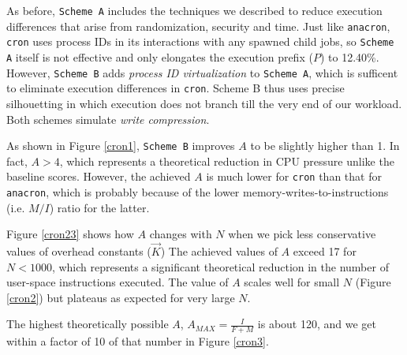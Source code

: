 As before, \texttt{Scheme A} includes the techniques we described to reduce
execution differences that arise from randomization, security and time.
Just like \texttt{anacron}, \texttt{cron} uses process IDs
in its interactions with any spawned child jobs,
so \texttt{Scheme A} itself is not effective and only elongates the 
execution prefix ($P$) to 12.40\%.
However, \texttt{Scheme B} adds {\em process ID virtualization} to
\texttt{Scheme A}, which is sufficent to eliminate
execution differences in \texttt{cron}.
{Scheme B} thus uses precise silhouetting
in which execution does not branch till the very end of our workload.
Both schemes simulate {\em write compression}.

As shown in Figure \ref{cron1}, \texttt{Scheme B} improves $A$ 
to be slightly higher than 1. In fact, $A > 4$, which represents                                                                                             
a theoretical reduction in CPU pressure unlike the baseline
scores. However, the achieved $A$ is much lower for \texttt{cron} than that for \texttt{anacron},
which is probably because of the lower memory-writes-to-instructions (i.e. $M/I$) ratio
for the latter.

Figure \ref{cron23} shows how $A$ changes with $N$ when we pick less conservative
values of overhead constants ($\vec K$) 
The achieved values of $A$ 
exceed 17 for $N < 1000$, which represents a significant
theoretical reduction in the number of user-space instructions
executed. The value of $A$ scales well for small $N$
(Figure \ref{cron2}) but plateaus as expected
for very large $N$.

The highest theoretically possible
$A$, $A_{MAX} = \frac{I}{F+M}$  is about 120, and we get within a factor of 10 of that number in Figure \ref{cron3}. 

